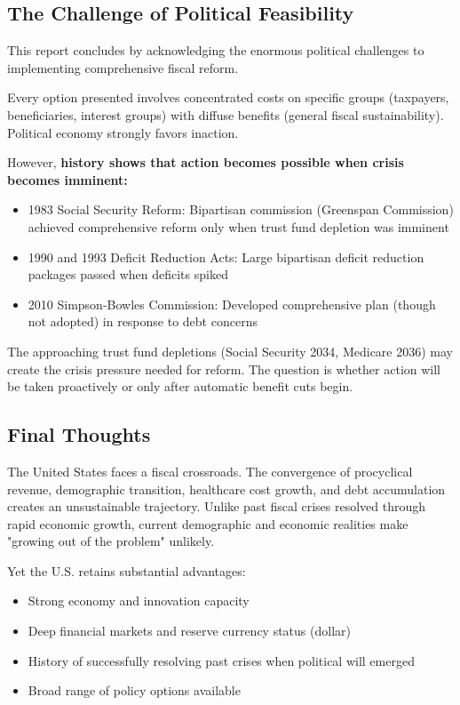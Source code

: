 \documentclass[12pt,letterpaper]{article}
\begin{document}
\subsection{The Challenge of Political Feasibility}

This report concludes by acknowledging the enormous political challenges to implementing comprehensive fiscal reform.

Every option presented involves concentrated costs on specific groups (taxpayers, beneficiaries, interest groups) with diffuse benefits (general fiscal sustainability). Political economy strongly favors inaction.

However, \textbf{history shows that action becomes possible when crisis becomes imminent:}

\begin{itemize}
    \item 1983 Social Security Reform: Bipartisan commission (Greenspan Commission) achieved comprehensive reform only when trust fund depletion was imminent
    \item 1990 and 1993 Deficit Reduction Acts: Large bipartisan deficit reduction packages passed when deficits spiked
    \item 2010 Simpson-Bowles Commission: Developed comprehensive plan (though not adopted) in response to debt concerns
\end{itemize}

The approaching trust fund depletions (Social Security 2034, Medicare 2036) may create the crisis pressure needed for reform. The question is whether action will be taken proactively or only after automatic benefit cuts begin.

\subsection{Final Thoughts}

The United States faces a fiscal crossroads. The convergence of procyclical revenue, demographic transition, healthcare cost growth, and debt accumulation creates an unsustainable trajectory. Unlike past fiscal crises resolved through rapid economic growth, current demographic and economic realities make "growing out of the problem" unlikely.

Yet the U.S. retains substantial advantages:
\begin{itemize}
    \item Strong economy and innovation capacity
    \item Deep financial markets and reserve currency status (dollar)
    \item History of successfully resolving past crises when political will emerged
    \item Broad range of policy options available
\end{itemize}
\end{document}
